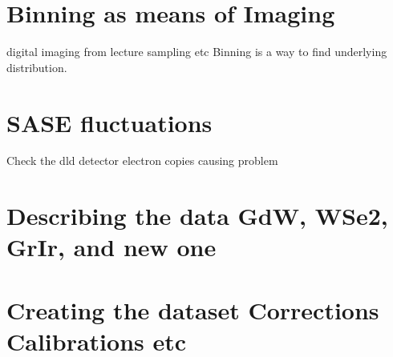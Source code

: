 \section{Binning as means of Imaging}
digital imaging from lecture
sampling etc
Binning is a way to find underlying distribution.


\section{SASE fluctuations}

Check the dld detector electron copies causing problem


\section{Describing the data GdW, WSe2, GrIr, and new one}

\section{Creating the dataset Corrections Calibrations etc}